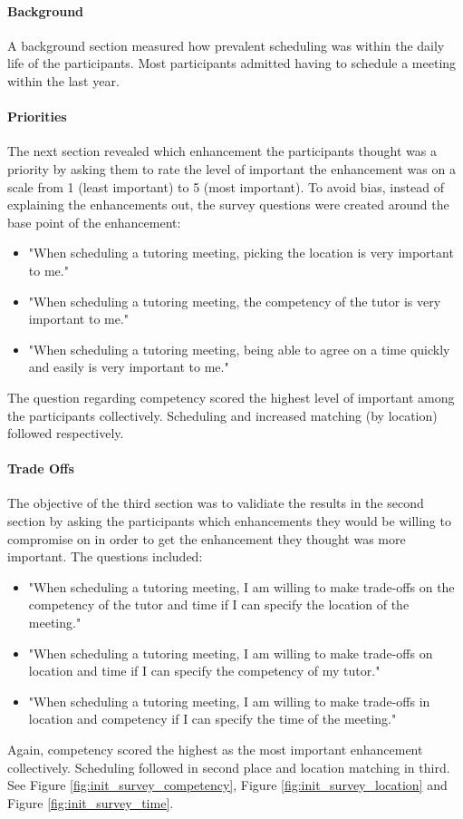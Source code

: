 \paragraph{Background} A background section measured how prevalent scheduling
was within the daily life of the participants. Most participants admitted having
to schedule a meeting within the last year.

\paragraph{Priorities} The next section revealed which enhancement the
participants thought was a priority by asking them to rate the level of
important the enhancement was on a scale from 1 (least important) to 5 (most
important). To avoid bias, instead of explaining the enhancements out, the
survey questions were created around the base point of the enhancement:
\begin{itemize}
\item "When scheduling a tutoring meeting, picking the location is very
  important to me."
\item "When scheduling a tutoring meeting, the competency of the tutor is very
  important to me."
\item "When scheduling a tutoring meeting, being able to agree on a time quickly
  and easily is very important to me."
\end{itemize} The question regarding competency scored the highest level of
important among the participants collectively. Scheduling and increased matching
(by location) followed respectively.

\paragraph{Trade Offs} The objective of the third section was to validiate the
results in the second section by asking the participants which enhancements they
would be willing to compromise on in order to get the enhancement they thought
was more important. The questions included:
\begin{itemize}
\item "When scheduling a tutoring meeting, I am willing to make trade-offs on
  the competency of the tutor and time if I can specify the location of the
  meeting."
\item "When scheduling a tutoring meeting, I am willing to make trade-offs on
  location and time if I can specify the competency of my tutor."
\item "When scheduling a tutoring meeting, I am willing to make trade-offs in
  location and competency if I can specify the time of the meeting."
\end{itemize}
Again, competency scored the highest as the most important enhancement
collectively. Scheduling followed in second place and location matching in
third. See Figure \ref{fig:init_survey_competency}, Figure
\ref{fig:init_survey_location} and Figure \ref{fig:init_survey_time}.


